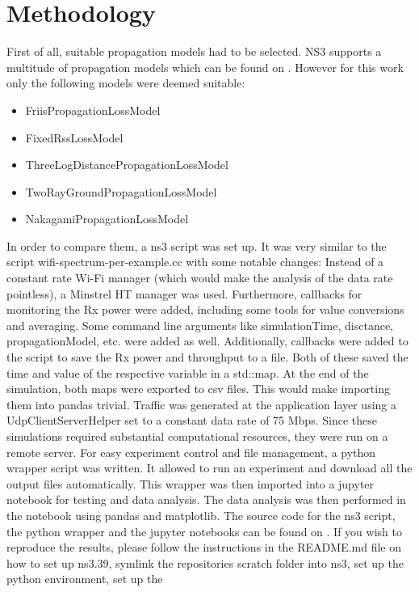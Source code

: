 \section[short]{Methodology}

First of all, suitable propagation models had to be selected.
NS3 supports a multitude of propagation models which can be found on \cite[the ns3 website]{ns3prpmod}.
However for this work only the following models were deemed suitable:
\begin{itemize}
    \item FriisPropagationLossModel
    \item FixedRssLossModel
    \item ThreeLogDistancePropagationLossModel
    \item TwoRayGroundPropagationLossModel
    \item NakagamiPropagationLossModel
\end{itemize}
In order to compare them, a ns3 script was set up. It was very similar to the script wifi-spectrum-per-example.cc 
with some notable changes: Instead of a constant rate Wi-Fi manager (which would make the analysis of the data rate 
pointless), a Minstrel HT manager was used. 
Furthermore, callbacks for monitoring the Rx power were added, including some tools for value conversions and
averaging. Some command line arguments like simulationTime, disctance, propagationModel, etc. were added as well.
Additionally, callbacks were added to the script to save the Rx power and throughput to a file.
Both of these saved the time and value of the respective variable in a std::map. At the end of the simulation, 
both maps were exported to csv files. This would make importing them into pandas trivial.
Traffic was generated at the application layer using a UdpClientServerHelper set to a constant data rate of 75 Mbps.
Since these simulations required substantial computational resources, they were run on a remote server. 
For easy experiment control and file management, a python wrapper script was written. It allowed to run an experiment 
and download all the output files automatically. This wrapper was then imported into a jupyter notebook for 
testing and data analysis. The data analysis was then performed in the notebook using pandas and matplotlib.
The source code for the ns3 script, the python wrapper and the jupyter notebooks can be found on \cite[the author's github]{github}.
If you wish to reproduce the results, please follow the instructions in the README.md file on how to 
set up ns3.39, symlink the repositories scratch folder into ns3, set up the python environment, set up the 
